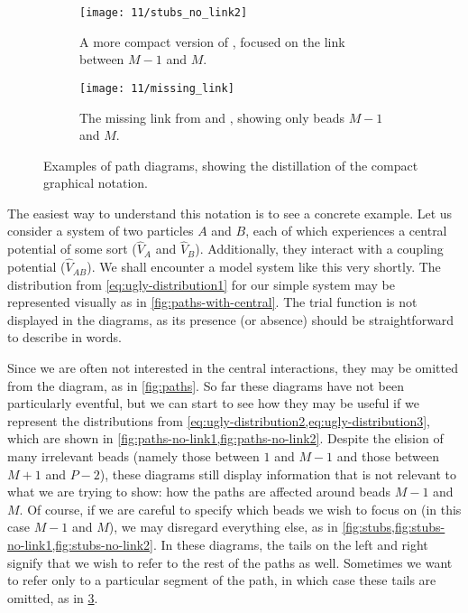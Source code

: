 \begin{figure}
	\mbox{}
	\hfill
	\begin{subfigure}[b]{0.4\textwidth}
		\centering
		\texttt{[image: 11/stubs\_no\_link2]}
		\caption{
			A more compact version of , focused on the link between $M-1$ and $M$.
		}
		\label{fig:stubs-no-link2}
	\end{subfigure}
	\hfill
	\begin{subfigure}[b]{0.4\textwidth}
		\centering
		\texttt{[image: 11/missing\_link]}
		\caption{
			The missing link from  and , showing only beads $M-1$ and $M$.
		}
		\label{fig:missing-link}
	\end{subfigure}
	\hfill
	\mbox{}
	\caption[
		Examples of path diagrams
	]{
		Examples of path diagrams, showing the distillation of the compact graphical notation.
	}
\end{figure}

The easiest way to understand this notation is to see a concrete example.
Let us consider a system of two particles $A$ and $B$, each of which experiences a central potential of some sort ($\hat{V}_A$ and $\hat{V}_B$).
Additionally, they interact with a coupling potential ($\hat{V}_{AB}$).
We shall encounter a model system like this very shortly.
The distribution from \cref{eq:ugly-distribution1} for our simple system may be represented visually as in \cref{fig:paths-with-central}.
The trial function is not displayed in the diagrams, as its presence (or absence) should be straightforward to describe in words.

Since we are often not interested in the central interactions, they may be omitted from the diagram, as in \cref{fig:paths}.
So far these diagrams have not been particularly eventful, but we can start to see how they may be useful if we represent the distributions from \cref{eq:ugly-distribution2,eq:ugly-distribution3}, which are shown in \cref{fig:paths-no-link1,fig:paths-no-link2}.
Despite the elision of many irrelevant beads (namely those between $1$ and $M-1$ and those between $M+1$ and $P-2$), these diagrams still display information that is not relevant to what we are trying to show: how the paths are affected around beads $M-1$ and $M$.
Of course, if we are careful to specify which beads we wish to focus on (in this case $M-1$ and $M$), we may disregard everything else, as in \cref{fig:stubs,fig:stubs-no-link1,fig:stubs-no-link2}.
In these diagrams, the tails on the left and right signify that we wish to refer to the rest of the paths as well.
Sometimes we want to refer only to a particular segment of the path, in which case these tails are omitted, as in \cref{fig:missing-link}.

